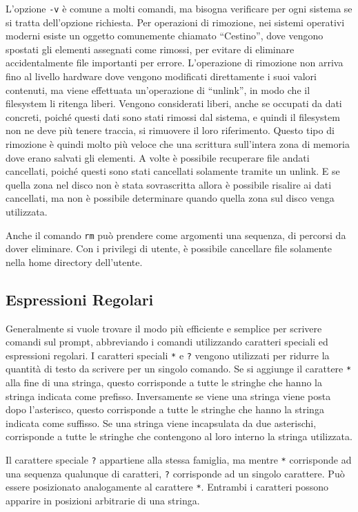 \documentclass{article}
\numberwithin{equation}{subsection}
\begin{document}
L'opzione \verb|-v| è comune a molti comandi, ma bisogna verificare per ogni sistema se si tratta dell'opzione richiesta. 
Per operazioni di rimozione, nei sistemi operativi moderni esiste un oggetto comunemente chiamato ``Cestino'', dove vengono spostati gli elementi assegnati come rimossi, per evitare di eliminare accidentalmente
file importanti per errore. L'operazione di rimozione non arriva fino al livello hardware dove vengono modificati direttamente i suoi valori contenuti, ma viene effettuata un'operazione di ``unlink'', in modo che 
il filesystem li ritenga liberi. Vengono considerati liberi, anche se occupati da dati concreti, poiché questi dati sono stati rimossi dal sistema, e quindi il filesystem non ne deve più tenere traccia, si rimuovere 
il loro riferimento. 
Questo tipo di rimozione è quindi molto più veloce che una scrittura sull'intera zona di memoria dove erano salvati gli elementi. A volte è possibile recuperare file andati cancellati, poiché questi sono stati 
cancellati solamente tramite un unlink. E se quella zona nel disco non è stata sovrascritta allora è possibile risalire ai dati cancellati, ma non è possibile determinare quando quella zona sul disco venga 
utilizzata. 

Anche il comando \verb|rm| può prendere come argomenti una sequenza, di percorsi da dover eliminare. Con i privilegi di utente, è possibile cancellare file solamente nella home directory dell'utente. 

\subsection{Espressioni Regolari}

Generalmente si vuole trovare il modo più efficiente e semplice per scrivere comandi sul prompt, abbreviando i comandi utilizzando caratteri speciali ed espressioni regolari.
I caratteri speciali \verb|*| e \verb|?| vengono utilizzati per ridurre la quantità di testo da scrivere per un singolo comando. Se si aggiunge il carattere \verb|*| alla fine di una stringa, questo corrisponde 
a tutte le stringhe che hanno la stringa indicata come prefisso. Inversamente se viene una stringa viene posta dopo l'asterisco, questo corrisponde a tutte le stringhe che hanno la stringa indicata come 
suffisso. Se una stringa viene incapsulata da due asterischi, corrisponde a tutte le stringhe che contengono al loro interno la stringa utilizzata. 

Il carattere speciale \verb|?| appartiene alla stessa famiglia, ma mentre \verb|*| corrisponde ad una sequenza qualunque di caratteri, \verb|?| corrisponde ad un singolo carattere. Può essere posizionato 
analogamente al carattere \verb|*|. Entrambi i caratteri possono apparire in posizioni arbitrarie di una stringa. 
\end{document}
